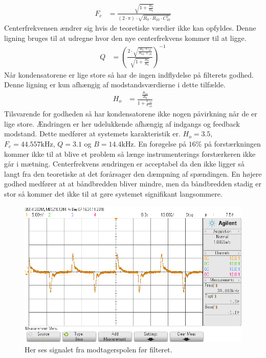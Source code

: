 \begin{align}
	F_c & = \frac{\sqrt{1+\frac{R_9}{R_8}}}{\left( 2 \cdot \pi \right) \cdot \sqrt{R_9 \cdot R_{10} \cdot C_{10}^2}}
	\end{align}
Centerfrekvensen ændrer sig hvis de teoretiske værdier ikke kan opfyldes. Denne ligning bruges til at udregne hvor den nye centerfrekvens kommer til at ligge.
\begin{align}
	Q & = \left( \frac{2 \cdot \sqrt{\frac{R_9 \cdot C_{10}}{R_{10} \cdot C_{10}}}}{\sqrt{1+\frac{R_9}{R_8}}} \right)^{-1}
	\end{align}
Når kondensatorene er lige store så har de ingen indflydelse på filterets godhed. Denne ligning er kun afhængig af modstandsværdierne i dette tilfælde.
\begin{align}
	H_o & = \frac{\frac{R_{10}}{R_8}}{1+\frac{C_{10}}{C_{10}}}
\end{align}
Tilsvarende for godheden så har kondensatorene ikke nogen påvirkning når de er lige store.
Ændringen er her udelukkende afhængig af indgangs og feedback modstand.
Dette medfører at systemets karakteristik er. 
$H_o = 3.5$, $F_c = 44.557 \si{\kilo\hertz}$, $Q = 3.1$ og $B = 14.4 \si{\kilo\hertz}$. 
En forøgelse på $16 \%$ på forstærkningen kommer ikke til at blive et problem så længe instrumenterings forstærkeren ikke går i mætning. 
Centerfrekvens ændringen er acceptabel da den ikke ligger så langt fra den teoretiske at det forårsager den dæmpning af spændingen.
En højere godhed medfører at at båndbredden bliver mindre, men da båndbredden stadig er stor så kommer det ikke til at gøre systemet signifikant langsommere.
\begin{figure}[h!]
	\centering
	\includegraphics[width=1\textwidth]{billeder/filter_in_png.png}
	\caption{Her ses signalet fra modtagerspolen før filteret.}
	\label{fig:filter_in}
\end{figure}

